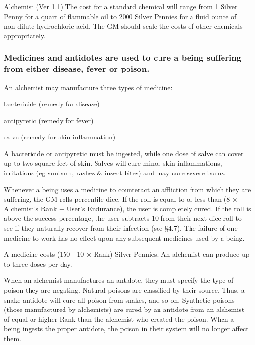 \begin{Chapter}{Alchemist (Ver 1.1)}
The cost for a standard chemical will range from 1 Silver Penny for a
quart of flammable oil to 2000 Silver Pennies for a fluid ounce of
non-dilute hydrochloric acid.  The GM should scale the costs of other
chemicals appropriately.

\subsubsection{Medicines and antidotes are used to cure a being suffering from either
disease, fever or poison.}

An alchemist may manufacture three types of medicine:

\begin{Itemize}

\item bactericide (remedy for disease)  

\item antipyretic (remedy for fever)  

\item salve (remedy for skin inflammation) 

\end{Itemize}

A bactericide or antipyretic must be ingested, while one dose of salve
can cover up to two square feet of skin. Salves will cure minor skin
inflammations, irritations (eg sunburn, rashes \& insect bites) and
may cure severe burns.

Whenever a being uses a medicine to counteract an affliction from
which they are suffering, the GM rolls percentile dice.  If the roll
is equal to or less than (8 × Alchemist’s Rank + User’s Endurance),
the user is completely cured. If the roll is above the success
percentage, the user subtracts 10 from their next dice-roll to see if
they naturally recover from their infection (see §4.7). The failure of
one medicine to work has no effect upon any subsequent medicines
used by a being.

A medicine costs (150 - 10 × Rank) Silver Pennies.  An alchemist can
produce up to three doses per day.

When an alchemist manufactures an antidote, they must specify the type
of poison they are negating.  Natural poisons are classified by their
source.  Thus, a snake antidote will cure all poison from snakes, and
so on. Synthetic poisons (those manufactured by alchemists) are cured
by an antidote from an alchemist of equal or higher Rank than the
alchemist who created the poison.  When a being ingests the proper
antidote, the poison in their system will no longer affect them.


\end{Chapter}
